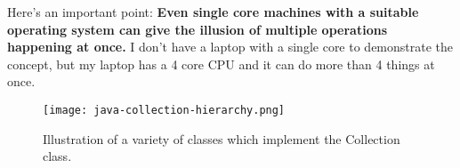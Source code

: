 \documentclass[12pt]{article}
\begin{document}
Here's an important point: \textbf{Even single core machines with a suitable operating system can give the illusion of multiple operations happening at once.} I don't have a laptop with a single core to demonstrate the concept, but my laptop has a 4 core CPU and it can do more than 4 things at once.



\begin{figure}[h]
  \centering
    \texttt{[image: java-collection-hierarchy.png]}
  \caption{Illustration of a variety of classes which implement the Collection class.}
\end{figure}
\end{document}
